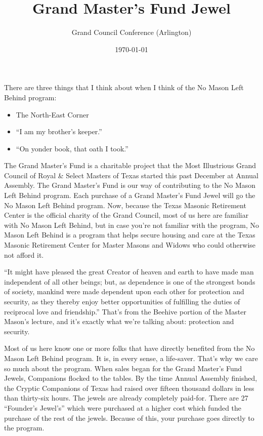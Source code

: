 \documentclass{article}
\title{\vspace*{-3em}Grand Master's Fund Jewel}
\author{Grand Council Conference (Arlington)}
\date{\today}
\begin{document}
	\maketitle
		There are three things that I think about when I think of the No Mason Left Behind program:
		\begin{itemize}
			\item The North-East Corner
			\item ``I am my brother's keeper.''
			\item ``On yonder book, that oath I took.''
		\end{itemize}
		The Grand Master's Fund is a charitable project that the Most Illustrious Grand Council of Royal \& Select Masters of Texas started this past December at Annual Assembly. The Grand Master's Fund is our way of contributing to the No Mason Left Behind program. Each purchase of a Grand Master's Fund Jewel will go the No Mason Left Behind program. Now, because the Texas Masonic Retirement Center is the official charity of the Grand Council, most of us here are familiar with No Mason Left Behind, but in case you're not familiar with the program, No Mason Left Behind is a program that helps secure housing and care at the Texas Masonic Retirement Center for Master Masons and Widows who could otherwise not afford it.
		
		``It might have pleased the great Creator of heaven and earth to have made man independent of all other beings; but, as dependence is one of the strongest bonds of society, mankind were made dependent upon each other for protection and security, as they thereby enjoy better opportunities of fulfilling the duties of reciprocal love and friendship.'' That's from the Beehive portion of the Master Mason's lecture, and it's exactly what we're talking about: protection and security.
		
		Most of us here know one or more folks that have directly benefited from the No Mason Left Behind program. It is, in every sense, a life-saver. That's why we care so much about the program. When sales began for the Grand Master's Fund Jewels, Companions flocked to the tables. By the time Annual Assembly finished, the Cryptic Companions of Texas had raised over fifteen thousand dollars in less than thirty-six hours. The jewels are already completely paid-for. There are 27 ``Founder's Jewel's'' which were purchased at a higher cost which funded the purchase of the rest of the jewels. Because of this, your purchase goes directly to the program.  
		
\end{document}
